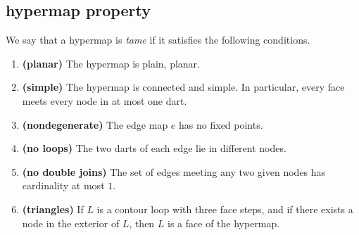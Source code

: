 




\subsection{hypermap property}
\label{sec:graphproperty}



We say that a hypermap is {\it tame\/} if it satisfies the following
conditions.
%

\begin{enumerate}
    \label{definition:tame}
    \item {\bf (planar)} The hypermap is plain, planar.
    \item {\bf (simple)} The hypermap is connected and simple.  In particular, every face meets every node in at most one dart.
    \item {\bf (nondegenerate)} The edge map $e$ has no fixed points.
    \item {\bf (no loops)} The two darts of each edge lie in different nodes.
    \item {\bf (no double joins)} The set of edges meeting any two given nodes has cardinality at most $1$.
    \label{definition:tame:40}

    \item {\bf (triangles)} If $L$ is a contour loop with three face steps, and if there exists a node in
    the exterior of $L$, then $L$ is a face of the hypermap.
    \label{definition:tame:3-circuit}


\end{enumerate}
